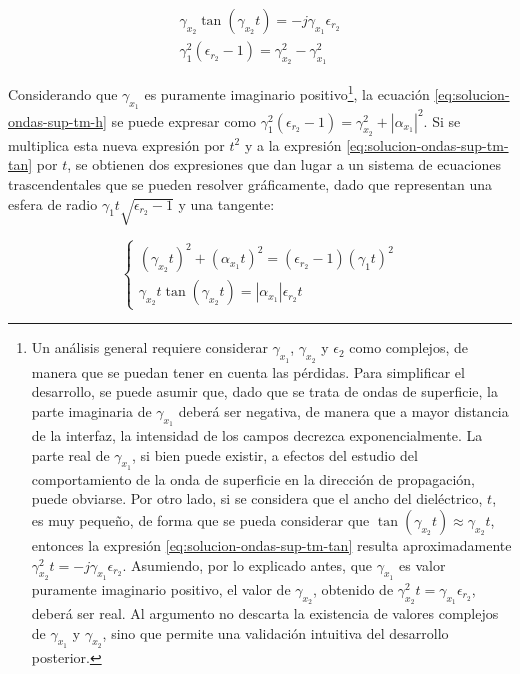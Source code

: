 \begin{align}
	\label{eq:solucion-ondas-sup-tm-tan}
	\gamma_{x_2} \tan (\gamma_{x_2} t) = -j \gamma_{x_1} \epsilon_{r_2} \\
	\gamma_1^2 (\epsilon_{r_2}-1) = \gamma_{x_2}^2 - \gamma_{x_1}^2
	\label{eq:solucion-ondas-sup-tm-h}
\end{align}

Considerando que $\gamma_{x_1}$ es puramente imaginario positivo\footnote{Un análisis general requiere considerar $\gamma_{x_1}$, $\gamma_{x_2}$ y $\epsilon_2$ como complejos, de manera que se puedan tener en cuenta las pérdidas. Para simplificar el desarrollo, se puede asumir que, dado que se trata de ondas de superficie, la parte imaginaria de $\gamma_{x_1}$ deberá ser negativa, de manera que a mayor distancia de la interfaz, la intensidad de los campos decrezca exponencialmente. La parte real de $\gamma_{x_1}$, si bien puede existir, a efectos del estudio del comportamiento de la onda de superficie en la dirección de propagación, puede obviarse. Por otro lado, si se considera que el ancho del dieléctrico, $t$, es muy pequeño, de forma que se pueda considerar que $\tan(\gamma_{x_2} t) \approx \gamma_{x_2} t$, entonces la expresión \ref{eq:solucion-ondas-sup-tm-tan} resulta aproximadamente $\gamma_{x_2}^2 t = -j \gamma_{x_1} \epsilon_{r_2}$. Asumiendo, por lo explicado antes, que $\gamma_{x_1}$ es valor puramente imaginario positivo, el valor de $\gamma_{x_2}$, obtenido de $\gamma_{x_2}^2 t = \gamma_{x_1} \epsilon_{r_2}$, deberá ser real. Al argumento no descarta la existencia de valores complejos de $\gamma_{x_1}$ y $\gamma_{x_2}$, sino que permite una validación intuitiva del desarrollo posterior.}, la ecuación \ref{eq:solucion-ondas-sup-tm-h} se puede expresar como $\gamma_1^2 (\epsilon_{r_2}-1) = \gamma_{x_2}^2 + |\alpha_{x_1}|^2$. Si se multiplica esta nueva expresión por $t^2$ y a la expresión \ref{eq:solucion-ondas-sup-tm-tan} por $t$, se obtienen dos expresiones que dan lugar a un sistema de ecuaciones trascendentales que se pueden resolver gráficamente, dado que representan una esfera de radio $\gamma_1 t \sqrt{\epsilon_{r_2}-1}$ y una tangente:

\begin{equation}
	\label{eq:sistema-ondas-superficiales-TM}
	\begin{cases}
		(\gamma_{x_2} t)^2 + (\alpha_{x_1} t)^2 = (\epsilon_{r_2} - 1) (\gamma_1 t)^2\\
		\gamma_{x_2} t \tan (\gamma_{x_2} t) = |\alpha_{x_1}| \epsilon_{r_2} t
	\end{cases}
\end{equation}

